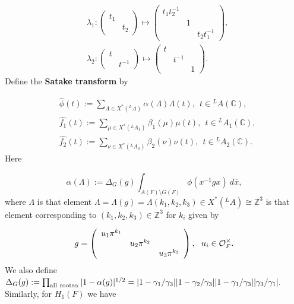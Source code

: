 \documentclass[12pt,letterpaper]{article}
\def\ccc{\mathbb{C}}
\def\zzz{\mathbb{Z}}
\def\off{{\cal O}_F}
\def\ovx{\overline{x}}
\begin{document}
\[
\begin{split}
&\lambda_1 : 
\left( 
\begin{array}{cc} 
t_1&\ \\ 
\ &t_2
\end{array} 
\right) 
\longmapsto
\left( 
\begin{array}{ccc} 
t_1t_2^{-1}&\ &\ \\
\ &1&\ \\
\ &\ &t_2t_1^{-1}
\end{array} 
\right) ,\\
&\lambda_2 : 
\left( 
\begin{array}{ccc} 
t&\ \\ \ &t^{-1}
\end{array} 
\right) \longmapsto
\left( 
\begin{array}{ccc} 
t&\ &\ \\
\ &t^{-1}&\ \\
\ &\ &1
\end{array} 
\right) .
\end{split}
\]
Define the {\bf Satake transform} by

\begin{equation}
\label{eqn:2.7}
\begin{split}
&\hat{\phi}(t) := \sum_{\Lambda \in X^*({^{L}A})} \alpha (\Lambda )\Lambda (t),
\ \ t\in {^{L}A}(\ccc ),\\
&\hat{f_1}(t) := \sum_{\mu \in X^*({^{L}A_1})} \beta_1(\mu )\mu (t),
\ \ t\in {^{L}A_1}(\ccc ),\\
&\hat{f_2}(t) := \sum_{\nu \in X^*({^{L}A_2})} \beta_2(\nu )\nu (t),
\ \ t\in {^{L}A_2}(\ccc ).
\end{split}
\end{equation}
Here

\begin{equation}
\label{eqn:2.8}
\alpha (\Lambda ):=\Delta_G (g)\int_{A(F)\setminus G(F)}
\phi (x^{-1}gx)\ d\ovx ,
\end{equation}
where $\Lambda$ is that element $\Lambda =\Lambda (g)
=\Lambda (k_1,k_2,k_3) \in X^*({^{L}A})
\cong \zzz^3$ is that element corresponding to $(k_1,k_2,k_3)\in \zzz^3$
for $k_i$ given by

\[
g = \left( \begin{array}{ccc} u_1\pi^{k_1}&\ &\ \\
\ &u_2\pi^{k_2}&\ \\
\ &\ &u_3\pi^{k_3}\end{array} \right) ,\ \ u_i\in \off^{\times}.
\]
We also define $\Delta_G(g)
:=\prod_{{\rm all\  roots }\alpha }|1-\alpha (g)|^{1/2}
=|1-\gamma_1/\gamma_3||1-\gamma_2/\gamma_3||1-\gamma_1/\gamma_3|
|\gamma_3/\gamma_1|.$ Similarly, for $H_1(F)$ we have
\end{document}
